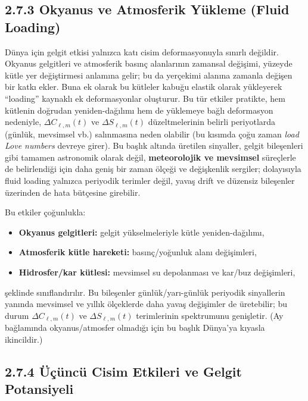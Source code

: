 \subsection*{2.7.3 \hspace{0.25em} Okyanus ve Atmosferik Yükleme (Fluid Loading)}
\label{subsec:fluid_loading}
Dünya için gelgit etkisi yalnızca katı cisim deformasyonuyla sınırlı değildir.
Okyanus gelgitleri ve atmosferik basınç alanlarının zamansal değişimi,
yüzeyde kütle yer değiştirmesi anlamına gelir; bu da yerçekimi alanına zamanla değişen bir katkı ekler.
Buna ek olarak bu kütleler kabuğu elastik olarak yükleyerek ``loading'' kaynaklı ek deformasyonlar oluşturur.
Bu tür etkiler pratikte, hem kütlenin doğrudan yeniden-dağılımı hem de yüklemeye bağlı deformasyon nedeniyle,
$\Delta C_{\ell,m}(t)$ ve $\Delta S_{\ell,m}(t)$ düzeltmelerinin belirli periyotlarda (günlük, mevsimsel vb.)
salınmasına neden olabilir (bu kısımda çoğu zaman \emph{load Love numbers} devreye girer).
Bu başlık altında üretilen sinyaller, gelgit bileşenleri gibi tamamen astronomik olarak değil,
\textbf{meteorolojik ve mevsimsel} süreçlerle de belirlendiği için daha geniş bir zaman ölçeği ve değişkenlik sergiler;
dolayısıyla fluid loading yalnızca periyodik terimler değil, yavaş drift ve düzensiz bileşenler üzerinden de hata bütçesine girebilir.

Bu etkiler çoğunlukla:
\begin{itemize}
    \item \textbf{Okyanus gelgitleri:} gelgit yükselmeleriyle kütle yeniden-dağılımı,
    \item \textbf{Atmosferik kütle hareketi:} basınç/yoğunluk alanı değişimleri,
    \item \textbf{Hidrosfer/kar kütlesi:} mevsimsel su depolanması ve kar/buz değişimleri,
\end{itemize}
şeklinde sınıflandırılır. Bu bileşenler günlük/yarı-günlük periyodik sinyallerin yanında
mevsimsel ve yıllık ölçeklerde daha yavaş değişimler de üretebilir; bu durum
$\Delta C_{\ell,m}(t)$ ve $\Delta S_{\ell,m}(t)$ terimlerinin spektrumunu genişletir.
(Ay bağlamında okyanus/atmosfer olmadığı için bu başlık Dünya’ya kıyasla ikincildir.)


\newpage
\subsection*{2.7.4 \hspace{0.25em} Üçüncü Cisim Etkileri ve Gelgit Potansiyeli}
\label{subsec:third_body_tides}

